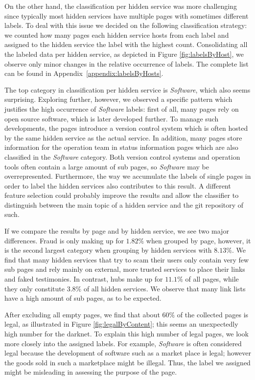 On the other hand, the classification per hidden service was more challenging since typically most hidden services have multiple pages with sometimes different labels. To deal with this issue we decided on the following classification strategy: we counted how many pages each hidden service hosts from each label and assigned to the hidden service the label with the highest count. Consolidating all the labeled data per hidden service, as depicted in Figure \ref{fig:labelsByHost}, we observe only minor changes in the relative occurrence of labels. The complete list can be found in Appendix~\ref{appendix:labelsByHosts}.

The top category in classification per hidden service is \emph{Software}, which also seems surprising. 
Exploring further, however, we observed a specific pattern which justifies the high occurrence of \emph{Software} labels:
first of all, many pages rely on open source software, which is later developed further. To manage such developments, the pages introduce a version control system which is often hosted by the same hidden service as the actual service. In addition, many pages store information for the operation team in status information pages which are also classified in the \emph{Software} category. Both version control systems and operation tools often contain a large amount of sub pages, so \emph{Software} may be overrepresented. 
Furthermore, the way we accumulate the labels of single pages in order to label the hidden services also contributes to this result. A different feature selection could probably improve the results and allow the classifier to distinguish between the main topic of a hidden service and the git repository of such.

If we compare the results by page and by hidden service, we see two major differences. Fraud is only making up for $1.82\%$ when grouped by page, however, it is the second largest category when grouping by hidden services with $8.13\%$. We find that many hidden services that try to scam their users only contain very few sub pages and rely mainly on external, more trusted services to place their links and faked testimonies.
In contrast, hubs make up for $11.1\%$ of all pages, while they only constitute $3.8\%$ of all hidden services. We observe that many link lists have a high amount of sub pages, as to be expected.

After excluding all empty pages, we find that about $60\%$ of the collected pages is legal, as illustrated in Figure \ref{fig:legalByContent}; this seems an unexpectedly high number for the darknet. To explain this high number of legal pages, we look more closely into the assigned labels. 
For example, \emph{Software} is often considered legal because the development of software such as a market place is legal; however the goods sold in such a marketplace might be illegal. Thus, the label we assigned might be misleading in assessing the purpose of the page.

